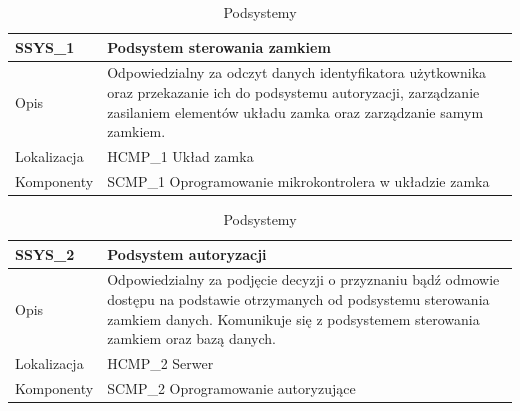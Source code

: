                 \begin{table}
                    \caption{Podsystemy}
                    \centering
                    \begin{subtable}[c]{\textwidth}
                        \centering
                        \begin{tabular}{p{2cm}|p{12cm}}
                            SSYS\_1      & \textbf{Podsystem sterowania zamkiem} \\
                            \hline Opis         & Odpowiedzialny za odczyt danych identyfikatora użytkownika oraz przekazanie ich do podsystemu autoryzacji, zarządzanie zasilaniem elementów układu zamka oraz zarządzanie samym zamkiem.  \\
                            \hline Lokalizacja  & HCMP\_1 Układ zamka    \\
                            \hline Komponenty   & SCMP\_1 Oprogramowanie mikrokontrolera w układzie zamka    \\
                            \end{tabular}
                        \label{tbl:scmp1}
                        \vspace{10mm}           
                    \end{subtable}
                \quad%
                    \begin{subtable}[c]{\textwidth}
                        \centering
                        \begin{tabular}{p{2cm}|p{12cm}}
                            SSYS\_2      & \textbf{Podsystem autoryzacji} \\
                            \hline  Opis         & Odpowiedzialny za podjęcie decyzji o przyznaniu bądź odmowie dostępu na podstawie otrzymanych od podsystemu sterowania zamkiem danych. Komunikuje się z podsystemem sterowania zamkiem oraz bazą danych. \\
                            \hline Lokalizacja  & HCMP\_2 Serwer    \\
                            \hline Komponenty   & SCMP\_2 Oprogramowanie autoryzujące \\
                        \end{tabular}
                        \label{tbl:ssys2}
                        \vspace{10mm}           
                    \end{subtable}
                \quad%
                    \begin{subtable}[c]{\textwidth}

\end{subtable}
\end{table}
